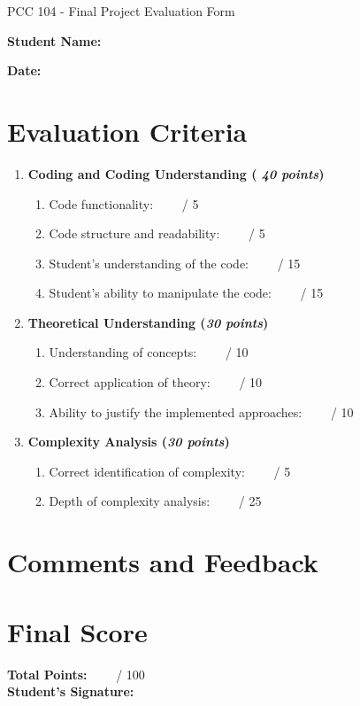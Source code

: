 \documentclass[12pt,a4paper]{article}
\begin{document}
\begin{center}
    {\Large PCC 104 - Final Project Evaluation Form}
\end{center}

\vspace{1cm}

\noindent \textbf{Student Name:} \\

\vspace{0.0cm}

\noindent \textbf{Date:}  


\section*{Evaluation Criteria}

\begin{enumerate}[label=\textbf{\arabic*.}]
    \item \textbf{Coding and Coding Understanding (\textit{ 40 points})}
    \begin{enumerate}[label=\alph*.]
        \item Code functionality: \ \ \ \   / 5 
        \item Code structure and readability: \ \ \ \   / 5 
        \item Student's understanding of the code: \ \ \ \   / 15
        \item Student's ability to manipulate the code: \ \ \ \   / 15
    \end{enumerate}

    \item \textbf{Theoretical Understanding (\textit{30 points})}
    \begin{enumerate}[label=\alph*.]
        \item Understanding of concepts: \ \ \ \   / 10 
        \item Correct application of theory: \ \ \ \   / 10 
        \item Ability to justify the implemented approaches: \ \ \ \   / 10
    \end{enumerate}

    \item \textbf{Complexity Analysis (\textit{30 points})}
    \begin{enumerate}[label=\alph*.]
        \item Correct identification of complexity: \ \ \ \   / 5
        \item Depth of complexity analysis: \ \ \ \   / 25 
    \end{enumerate}
\end{enumerate}
\vspace{0.5cm}

\section*{Comments and Feedback}
\vspace{5.5cm}

\section*{Final Score}
\textbf{Total Points:} \ \ \ \  / 100 \\

\noindent \textbf{Student's Signature:}
\end{document}

